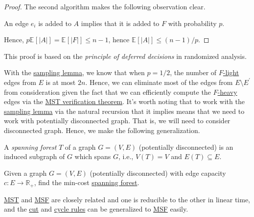 \begin{proof}
	The second algorithm makes the following observation clear.

	\begin{intuition}
		An edge \(e_i\) is added to \(A\) implies that it is added to \(F\) with probability \(p\).
	\end{intuition}

	Hence, \(p \mathbb{E}_{}[\lvert A \rvert ] = \mathbb{E}_{}[\lvert F \rvert ] \leq n - 1\), hence \(\mathbb{E}_{}[\lvert A \rvert ] \leq (n - 1) / p\).
\end{proof}

\begin{remark}
	This proof is based on the \emph{principle of deferred decisions} in randomized analysis.
\end{remark}

With the \hyperref[lma:sampling]{sampling lemma}, we know that when \(p = 1 / 2\), the number of \hyperref[def:light]{\(F\)-light} edges from \(E\) is at most \(2n\). Hence, we can eliminate most of the edges from \(E \setminus E^{\prime} \) from consideration given the fact that we can efficiently compute the \hyperref[def:heavy]{\(F\)-heavy} edges via the \hyperref[thm:MST-verification]{MST verification theorem}. It's worth noting that to work with the \hyperref[lma:sampling]{sampling lemma} via the natural recursion that it implies means that we need to work with potentially disconnected graph. That is, we will need to consider disconnected graph. Hence, we make the following generalization.

\begin{definition}\label{def:spanning-forest}
	A \emph{spanning forest} \(T\) of a graph \(G =(V, E)\) (potentially disconnected) is an induced subgraph of \(G\) which spans \(G\), i.e., \(V(T) = V\) and \(E(T) \subseteq E\).
\end{definition}

\begin{problem}\label{prb:MSF}
Given a graph \(G=(V, E)\) (potentially disconnected) with edge capacity \(c \colon E \to \mathbb{R} _+ \), find the min-cost \hyperref[def:spanning-forest]{spanning forest}.
\end{problem}

\begin{note}
	\hyperref[prb:MST]{MST} and \hyperref[prb:MSF]{MSF} are closely related and one is reducible to the other in linear time, and the \hyperref[lma:cut-rule]{cut} and \hyperref[lma:cycle-rule]{cycle rules} can be generalized to \hyperref[prb:MSF]{MSF} easily.
\end{note}

